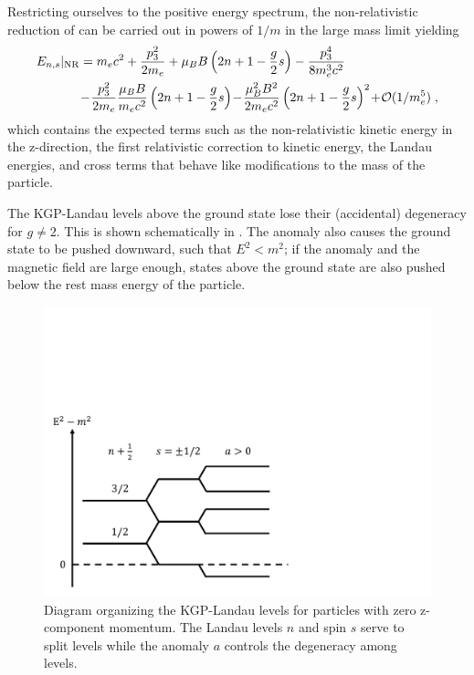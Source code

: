 Restricting ourselves to the positive energy spectrum, the non-relativistic reduction of  can be carried out in powers of $1/m$ in the large mass limit yielding
\begin{alignat}{1}
\label{lan27} E_{n,s}|_\mathrm{NR}&=m_{e}c^{2}+\frac{p_{3}^{2}}{2m_{e}}+\mu_{B}B\left(2n+1-\frac{g}{2}s\right)-\frac{p_{3}^{4}}{8m_{e}^{3}c^{2}}\\ \notag &\!-\!\frac{p_{3}^{2}}{2m_{e}}\frac{\mu_{B}B}{m_{e}c^{2}}\left(2n+1-\frac{g}{2}s\right)\!-\!\frac{\mu_{B}^{2}B^{2}}{2m_{e}c^{2}}\left(2n+1-\frac{g}{2}s\right)^{2}\!+\!\mathcal{O}(1/m_{e}^{5})\;,\end{alignat}
which contains the expected terms such as the non-relativistic kinetic energy in the z-direction, the first relativistic correction to kinetic energy, the Landau energies, and cross terms that behave like modifications to the mass of the particle.

The KGP-Landau levels above the ground state lose their (accidental) degeneracy for $g\neq 2$. This is shown schematically in . The anomaly also causes the ground state to be pushed downward, such that $E^{2}<m^{2}$; if the anomaly and the magnetic field are large enough, states above the ground state are also pushed below the rest mass energy of the particle.

\begin{figure}
 \centering
 \includegraphics[clip, trim=0.0cm 0.0cm 9.0cm 7.0cm,width=0.6\linewidth]{plots/chap02moment/lanplot04.pdf}
 \caption[]{Diagram organizing the KGP-Landau levels for particles with zero z-component momentum. The Landau levels $n$ and spin $s$ serve to split levels while the anomaly $a$ controls the degeneracy among levels.}
 \label{f04}
\end{figure}

